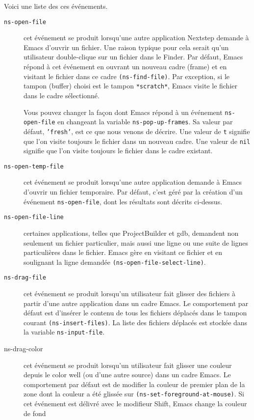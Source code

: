 Voici une liste des ces événements.
\begin{description}
\item[\texttt{ns-open-file}] cet événement se produit lorsqu'une autre
  application Nextstep demande à Emacs d'ouvrir un fichier. Une raison
  typique pour cela serait qu'un utilisateur double-clique sur un
  fichier dans le Finder. Par défaut, Emacs répond à cet événement en
  ouvrant un nouveau cadre (frame) et en visitant le fichier dans ce
  cadre \texttt{(ns-find-file)}. Par exception, si le tampon (buffer)
  choisi est le tampon \texttt{*scratch*}, Emacs visite le fichier
  dans le cadre sélectionné.

Vous pouvez changer la façon dont Emacs répond à un événement
\texttt{ns-open-file} en changeant la variable
\texttt{ns-pop-up-frames}. Sa valeur par défaut, \texttt{'fresh'}, est
ce que nous venons de décrire. Une valeur de \texttt{t} signifie que l'on
visite toujours le fichier dans un nouveau cadre. Une valeur de
\texttt{nil} signifie que l'on visite toujours le fichier dans le
cadre existant.
\item[\texttt{ns-open-temp-file}] cet événement se produit lorsqu'une
  autre application demande à Emacs d'ouvrir un fichier
  temporaire. Par défaut, c'est géré par la création d'un événement
  \texttt{ns-open-file}, dont les résultats sont décrits ci-dessus.
\item[\texttt{ns-open-file-line}] certaines applications, telles que
  ProjectBuilder et gdb, demandent non seulement un fichier
  particulier, mais aussi une ligne ou une suite de lignes
  particulières dans le fichier. Emacs gère en visitant ce fichier et
  en soulignant la ligne demandée \texttt{(ns-open-file-select-line)}.
\item[\texttt{ns-drag-file}] cet événement se produit lorsqu'un
  utilisateur fait glisser des fichiers à partir d'une autre
  application dans un cadre Emacs. Le comportement par défaut est
  d'insérer le contenu de tous les fichiers déplacés dans le tampon
  courant \texttt{(ns-insert-files)}. La liste des fichiers déplacés
  est stockée dans la variable \texttt{ns-input-file}.
\item[ns-drag-color] cet événement se produit lorsqu'un utilisateur
  fait glisser une couleur depuis le color well (ou d'une autre
  source) dans un cadre Emacs. Le comportement par défaut est de
  modifier la couleur de premier plan de la zone dont la couleur a été
  glissée sur \texttt{(ns-set-foreground-at-mouse)}. Si cet événement
  est délivré avec le modifieur Shift, Emacs change la couleur de fond

\end{description}
